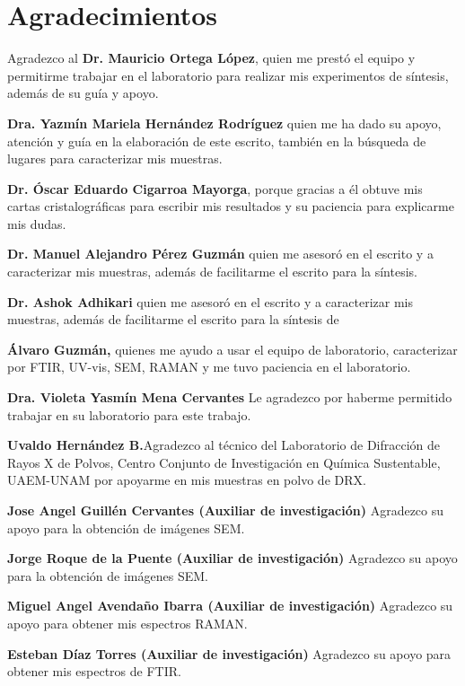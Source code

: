 \documentclass[12pt]{article}
\begin{document}
\newpage	
 
\section*{Agradecimientos}
Agradezco al \textbf{Dr. Mauricio Ortega López}, quien me prestó el equipo y permitirme trabajar en el laboratorio para realizar mis experimentos de síntesis, además de su guía y apoyo.



\textbf{Dra. Yazmín Mariela Hernández Rodríguez} quien me ha dado su apoyo, atención y guía en la elaboración de este escrito, también en la búsqueda de lugares para caracterizar mis muestras.



\textbf{Dr. Óscar Eduardo Cigarroa Mayorga}, porque gracias a él obtuve mis cartas cristalográficas para escribir mis resultados y su paciencia para explicarme mis dudas. 



\textbf{Dr. Manuel Alejandro Pérez Guzmán} quien me asesoró en el escrito y a caracterizar mis muestras, además de facilitarme el escrito para la síntesis.

\textbf{Dr. Ashok Adhikari } quien me asesoró en el escrito y a caracterizar mis muestras, además de facilitarme el escrito para la síntesis de 

\textbf{Álvaro Guzmán,} quienes me ayudo a usar el equipo de laboratorio, caracterizar por FTIR, UV-vis, SEM, RAMAN y me tuvo paciencia en el laboratorio.

\textbf{Dra. Violeta Yasmín Mena Cervantes} Le agradezco por haberme permitido trabajar en su laboratorio para este trabajo.

\textbf{Uvaldo Hernández B.}Agradezco al técnico del Laboratorio de Difracción de Rayos X de Polvos, Centro Conjunto de Investigación en Química Sustentable, UAEM-UNAM por apoyarme en mis muestras en polvo de DRX.

\textbf{Jose Angel Guillén Cervantes (Auxiliar de investigación)} Agradezco su apoyo para la obtención de imágenes SEM.

\textbf{Jorge Roque de la Puente (Auxiliar de investigación)} Agradezco su apoyo para la obtención de imágenes SEM.

\textbf{Miguel Angel Avendaño Ibarra (Auxiliar de investigación)} Agradezco su apoyo para obtener mis espectros RAMAN.

\textbf{Esteban Díaz Torres (Auxiliar de investigación)} Agradezco su apoyo para obtener mis espectros de FTIR.
\end{document}
